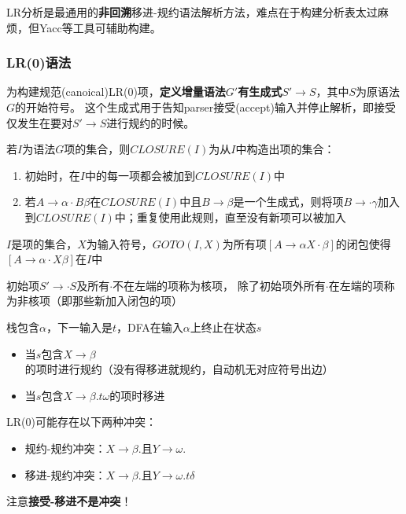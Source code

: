 LR分析是最通用的\textbf{非回溯}移进-规约语法解析方法，难点在于构建分析表太过麻烦，但Yacc等工具可辅助构建。

\subsubsection{LR(0)语法}
为构建规范(canoical)LR(0)项，\textbf{定义增量语法$G'$有生成式$S'\to S$}，其中$S$为原语法$G$的开始符号。
这个生成式用于告知parser接受(accept)输入并停止解析，即接受仅发生在要对$S'\to S$进行规约的时候。

\begin{definition}[CLOSURE]
若$I$为语法$G$项的集合，则$CLOSURE(I)$为从$I$中构造出项的集合：
\begin{enumerate}
	\item 初始时，在$I$中的每一项都会被加到$CLOSURE(I)$中
	\item 若$A\to\alpha\cdot B\beta$在$CLOSURE(I)$中且$B\to\beta$是一个生成式，则将项$B\to\cdot\gamma$加入到$CLOSURE(I)$中；重复使用此规则，直至没有新项可以被加入
\end{enumerate}
\end{definition}
\begin{definition}[GOTO]
$I$是项的集合，$X$为输入符号，$GOTO(I,X)$为所有项$[A\to\alpha X\cdot\beta]$的闭包使得$[A\to\alpha\cdot X\beta]$在$I$中
\end{definition}

\begin{definition}
初始项$S'\to\cdot S$及所有$\cdot$不在左端的项称为核项，
除了初始项外所有$\cdot$在左端的项称为非核项（即那些新加入闭包的项）
\end{definition}

\begin{definition}[LR(0)语法]
栈包含$\alpha$，下一输入是$t$，DFA在输入$\alpha$上终止在状态$s$
\begin{itemize}
	\item 当$s$包含$X\to\beta$的项时进行规约（没有得移进就规约，自动机无对应符号出边）
	\item 当$s$包含$X\to\beta.t\omega$的项时移进
\end{itemize}
\end{definition}

LR(0)可能存在以下两种冲突：
\begin{itemize}
	\item 规约-规约冲突：$X\to\beta.$且$Y\to\omega.$
	\item 移进-规约冲突：$X\to\beta.$且$Y\to\omega.t\delta$
\end{itemize}
注意\textbf{接受-移进不是冲突}！

